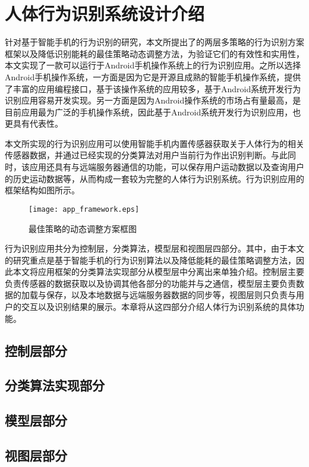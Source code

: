 \chapter{人体行为识别系统设计介绍}
\par 针对基于智能手机的行为识别的研究，本文所提出了的两层多策略的行为识别方案框架以及降低识别能耗的最佳策略动态调整方法，为验证它们的有效性和实用性，本文实现了一款可以运行于Android手机操作系统上的行为识别应用。之所以选择Android手机操作系统，一方面是因为它是开源且成熟的智能手机操作系统，提供了丰富的应用编程接口，基于该操作系统的应用较多，基于Android系统开发行为识别应用容易开发实现。另一方面是因为Android操作系统的市场占有量最高，是目前应用最为广泛的手机操作系统，因此基于Android系统开发行为识别应用，也更具有代表性。
\par 本文所实现的行为识别应用可以使用智能手机内置传感器获取关于人体行为的相关传感器数据，并通过已经实现的分类算法对用户当前行为作出识别判断。与此同时，该应用还具有与远端服务器通信的功能，可以保存用户运动数据以及查询用户的历史运动数据等，从而构成一套较为完整的人体行为识别系统。行为识别应用的框架结构如图所示。
\begin{figure}[ht]
\centering
\texttt{[image: app\_framework.eps]}
\caption{最佳策略的动态调整方案框图}
\end{figure}
\par 行为识别应用共分为控制层，分类算法，模型层和视图层四部分。其中，由于本文的研究重点是基于智能手机的行为识别算法以及降低能耗的最佳策略调整方法，因此本文将应用框架的分类算法实现部分从模型层中分离出来单独介绍。控制层主要负责传感器的数据获取以及协调其他各部分的功能并与之通信，模型层主要负责数据的加载与保存，以及本地数据与远端服务器数据的同步等，视图层则只负责与用户的交互以及识别结果的展示。本章将从这四部分介绍人体行为识别系统的具体功能。
\section{控制层部分}

\section{分类算法实现部分}
\section{模型层部分}
\section{视图层部分}

